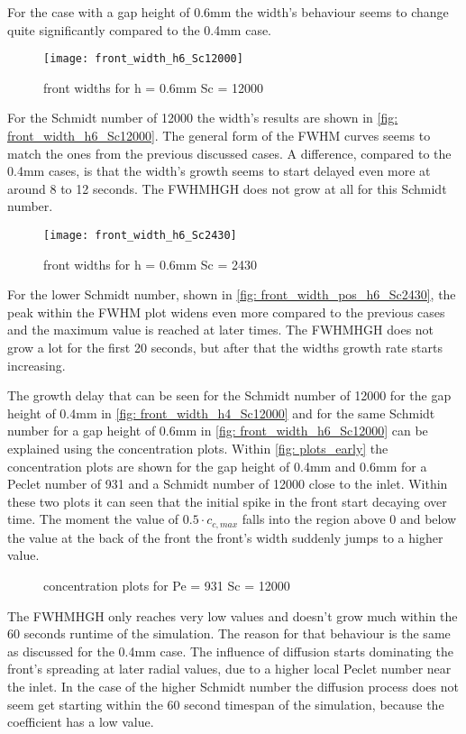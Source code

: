 \documentclass[../thesis.tex]{subfiles}
\begin{document}
For the case with a gap height of 0.6mm the width's behaviour seems to change quite significantly compared to the 0.4mm case. 
\begin{figure}[htb]
	\centering
	\texttt{[image: front\_width\_h6\_Sc12000]}
	\caption{front widths for  h = 0.6mm Sc = 12000}
	\label{fig: front_width_h6_Sc12000}
\end{figure}
For the Schmidt number of 12000 the width's results are shown in \autoref{fig: front_width_h6_Sc12000}. The general form of the FWHM curves seems to match the ones from the previous discussed cases. A difference, compared to the 0.4mm cases, is that the width's growth seems to start delayed even more at around 8 to 12 seconds. The FWHMHGH does not grow at all for this Schmidt number.
\begin{figure}[htb]
	\centering
	\texttt{[image: front\_width\_h6\_Sc2430]}
	\caption{front widths for  h = 0.6mm Sc = 2430}
	\label{fig: front_width_pos_h6_Sc2430}
\end{figure}
For the lower Schmidt number, shown in \autoref{fig: front_width_pos_h6_Sc2430}, the peak within the FWHM plot widens even more compared to the previous cases and the maximum value is reached at later times. The FWHMHGH does not grow a lot for the first 20 seconds, but after that the widths growth rate starts increasing.

The growth delay that can be seen for the Schmidt number of 12000 for the gap height of 0.4mm in \autoref{fig: front_width_h4_Sc12000} and for the same Schmidt number for a gap height of 0.6mm in \autoref{fig: front_width_h6_Sc12000} can be explained using the concentration plots. Within \autoref{fig: plots_early} the concentration plots are shown for the gap height of 0.4mm and 0.6mm for a Peclet number of 931 and a Schmidt number of 12000 close to the inlet. Within these two plots it can seen that the initial spike in the front start decaying over time. The moment the value of $0\text{.}5 \cdot c_{c,max}$ falls into the region above 0 and below the value at the back of the front the front's width suddenly jumps to a higher value.
\begin{figure}[htb]
	\centering
	\qquad
	\caption{concentration plots for  Pe = 931 Sc = 12000}%
	\label{fig: plots_early}%
\end{figure}
The FWHMHGH only reaches very low values and doesn't grow much within the 60 seconds runtime of the simulation. The reason for that behaviour is the same as discussed for the 0.4mm case. The influence of diffusion starts dominating the front's spreading at later radial values, due to a higher local Peclet number near the inlet. In the case of the higher Schmidt number the diffusion process does not seem get starting within the 60 second timespan of the simulation, because the coefficient has a low value.
\newline 
\end{document}
